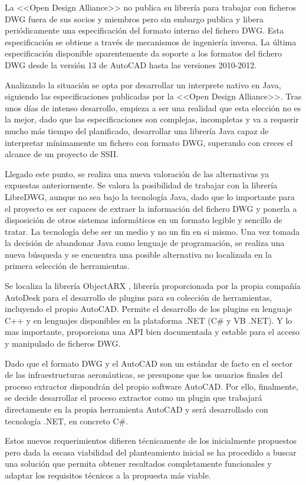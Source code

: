 La <<Open Design Alliance>> no publica su librería para trabajar con ficheros DWG fuera de sus socios y miembros pero sin embargo publica y libera periódicamente una especificación del formato interno del fichero DWG. Esta especificación se obtiene a través de mecanismos de ingeniería inversa. La última especificación disponible aparentemente da soporte a los formatos del fichero DWG desde la versión 13 de AutoCAD hasta las versiones 2010-2012. 

Analizando la situación se opta por desarrollar un interprete nativo en Java, siguiendo las especificaciones publicadas por la <<Open Design Alliance>>. Tras unos días de intenso desarrollo, empieza a ser una realidad que esta elección no es la mejor, dado que las especificaciones son complejas, incompletas y va a requerir mucho más tiempo del planificado, desarrollar una librería Java capaz de interpretar mínimamente un fichero con formato DWG, superando con creces el alcance de un proyecto de SSII.

Llegado este punto, se realiza una nueva valoración de las alternativas ya expuestas anteriormente. Se valora la posibilidad de trabajar con la librería LibreDWG, aunque no sea bajo la tecnología Java, dado que lo importante para el proyecto es ser capaces de extraer la información del fichero DWG y ponerla a disposición de otros sistemas informáticos en un formato legible y sencillo de tratar. La tecnología debe ser un medio y no un fin en si mismo. Una vez tomada la decisión de abandonar Java como lenguaje de programación, se realiza una nueva búsqueda y se encuentra una posible alternativa no localizada en la primera selección de herramientas. 

Se localiza la librería ObjectARX \cite{ObjectARX}, librería proporcionada por la propia compañía AutoDesk para el desarrollo de plugins para su colección de herramientas, incluyendo el propio AutoCAD. Permite el desarrollo de los plugins en lenguaje C++ y en lenguajes disponibles en la plataforma .NET (C\# y VB .NET). Y lo mas importante, proporciona una API bien documentada y estable para el acceso y manipulado de ficheros DWG.

Dado que el formato DWG y el AutoCAD son un estándar de facto en el sector de las infraestructuras aeronáuticas, se presupone que los usuarios finales del proceso extractor dispondrán del propio software AutoCAD. Por ello, finalmente, se decide desarrollar el proceso extractor como un plugin que trabajará directamente en la propia herramienta AutoCAD y será desarrollado con tecnología .NET, en concreto C\#. 

Estos nuevos requerimientos difieren técnicamente de los inicialmente propuestos pero dada la escasa viabilidad del planteamiento inicial se ha procedido a buscar una solución que permita obtener resultados completamente funcionales y adaptar los requisitos técnicos a la propuesta más viable.

